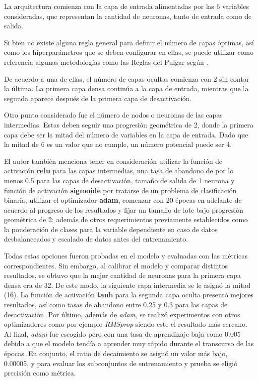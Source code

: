 La arquitectura comienza con la capa de entrada alimentadas por las 6 variables consideradas, que representan la cantidad de neuronas, tanto de entrada como de salida.

Si bien no existe alguna regla general para definir el número de capas óptimas, así como los hiperparámetros que se deben configurar en ellas, se puede utilizar como referencia algunas metodologías como las Reglas del Pulgar según \cite{tec_ranjan2019thumbrules}.

De acuerdo a una de ellas, el número de capas ocultas comienza con 2 sin contar la última. La primera capa densa continúa a la capa de entrada, mientras que la segunda aparece después de la primera capa de desactivación.

Otro punto considerado fue el número de nodos o neuronas de las capas intermedias. Estas deben seguir una progresión geométrica de 2, donde la primera capa debe ser la mitad del número de variables en la capa de entrada. Dado que la mitad de 6 es un valor que no cumple, un número potencial puede ser 4.

El autor también menciona tener en consideración utilizar la función de activación \textbf{relu} para las capas intermedias, una tasa de abandono de por lo menos 0.5 para las capas de desactivación, tamaño de salida de 1 neurona y función de activación \textbf{sigmoide} por tratarse de un problema de clasificación binaria, utilizar el optimizador \textbf{adam}, comenzar con 20 épocas en adelante de acuerdo al progreso de los resultados y fijar un tamaño de lote bajo progresión geométrica de 2; además de otros requerimientos previamente establecidos como la ponderación de clases para la variable dependiente en caso de datos desbalanceados y escalado de datos antes del entrenamiento.

Todas estas opciones fueron probadas en el modelo y evaluadas con las métricas correspondientes. Sin embargo, al calibrar el modelo y comparar distintos resultados, se obtuvo que la mejor cantidad de neuronas para la primera capa densa era de 32. De este modo, la siguiente capa intermedia se le asignó la mitad (16). La función de activación \textbf{tanh} para la segunda capa oculta presentó mejores resultados, así como tasas de abandono entre 0.25 y 0.3 para las capas de desactivación. Por último, además de \textit{adam}, se realizó experimentos con otros optimizadores como por ejemplo \textit{RMSprop} siendo este el resultado más cercano. Al final, \textit{adam} fue escogido pero con una tasa de aprendizaje baja como 0.005 debido a que el modelo tendía a aprender muy rápido durante el transcurso de las épocas. En conjunto, el ratio de decaimiento se asignó un valor más bajo, 0.00005, y para evaluar los subconjuntos de entrenamiento y prueba se eligió precisión como métrica.

